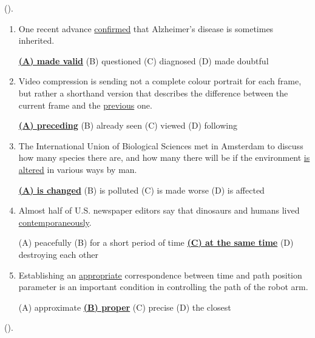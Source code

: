 \documentclass[main.tex]{subfiles}
\begin{document}
\setcounter{section}{100}



\hypertarget{ltask:2024-02-14}{} (\hyperref[task:2024-02-14]{\color{blue}{перейти к тексту задания без выбранного варианта ответа}}).
\vspace{3mm}

\begin{enumerate}[nosep,leftmargin=*]
	\itemsep10pt
	\item One recent advance \uline{confirmed} that Alzheimer's disease is sometimes inherited.
	
	\uline{\textbf{(A) made valid}} \quad (B) questioned \quad (C) diagnosed \quad (D) made doubtful
	\item Video compression is sending not a complete colour portrait for each frame, but rather a shorthand version that describes the difference between the current frame and the \uline{previous} one.
	
	\uline{\textbf{(A) preceding}} \quad (B) already seen \quad (C) viewed \quad (D) following
	\item The International Union of Biological Sciences met in Amsterdam to discuss how many species there are, and how many there will be if the environment \uline{is altered} in various ways by man.
	
	\uline{\textbf{(A) is changed}} \quad (B) is polluted \quad (C) is made worse \quad (D) is affected
	\item Almost half of U.S. newspaper editors say that dinosaurs and humans lived \uline{contemporaneously}.
	
	(A) peacefully \quad (B) for a short period of time \quad \uline{\textbf{(C) at the same time}} \quad (D) destroying each other
	\item Establishing an \uline{appropriate} correspondence between time and path position parameter is an important condition in controlling the path of the robot arm.
	
	(A) approximate \quad \uline{\textbf{(B) proper}} \quad (C) precise \quad (D) the closest
\end{enumerate}


 (\hyperref[task:2024-02-14]{\color{blue}{перейти к тексту задания без выбранного варианта ответа}}).
\vspace{3mm}
\end{document}
